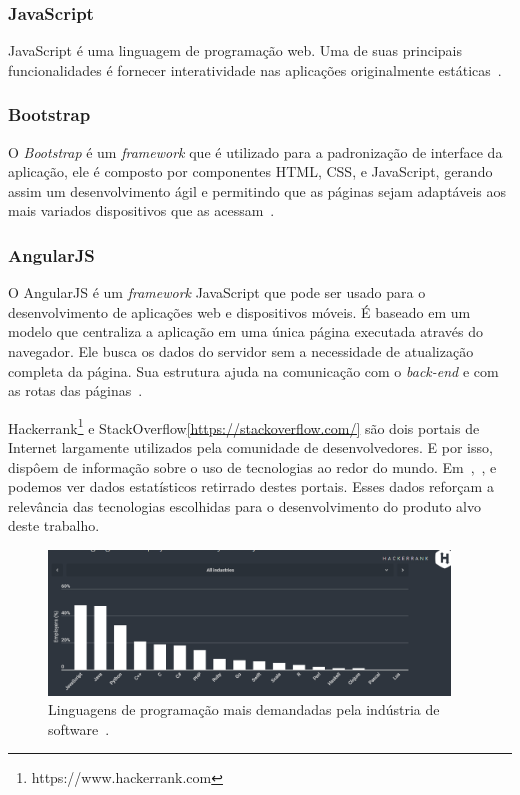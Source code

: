 \subsubsection{JavaScript}

JavaScript é uma linguagem de programação web.
Uma de suas principais funcionalidades é fornecer interatividade nas aplicações originalmente estáticas~\cite{de2016estudo}.

\subsubsection{Bootstrap}

O \textit{Bootstrap} é um \textit{framework} que é utilizado para a padronização de interface da aplicação, ele é composto por componentes HTML, CSS, e JavaScript, gerando assim um desenvolvimento ágil e permitindo que as páginas sejam adaptáveis aos mais variados dispositivos que as acessam~\cite{pereira2017ferramenta}. 

\subsubsection{AngularJS}

O AngularJS é um \textit{framework} JavaScript que pode ser usado para o desenvolvimento de aplicações web e dispositivos móveis.
É baseado em um modelo que centraliza a aplicação em uma única página executada através do navegador.
Ele busca os dados do servidor sem a necessidade de atualização completa da página.
Sua estrutura ajuda na comunicação com o \textit{back-end} e com as rotas das páginas~\cite{de2016estudo}.

Hackerrank\footnote{https://www.hackerrank.com} e StackOverflow\ref{https://stackoverflow.com/} são dois portais de Internet largamente utilizados pela comunidade de desenvolvedores. E por isso, dispôem de informação sobre o uso de tecnologias ao redor do mundo.
Em~,~, e~ podemos ver dados estatísticos retirrado destes portais.
Esses dados reforçam a relevância das tecnologias escolhidas para o desenvolvimento do produto alvo deste trabalho.


\begin{figure}[htp]
    \centering
    \includegraphics[width=0.95\textwidth]{figuras/figura002.png}
    \caption{Linguagens de programação mais demandadas pela indústria de software~\cite{linguagemEframework}.}
    \label{Figura002}
\end{figure}

